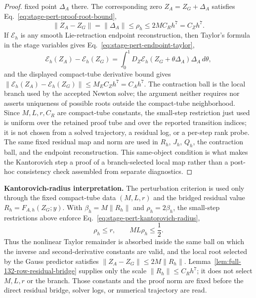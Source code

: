 \documentclass[preprint,12pt]{elsarticle}
\begin{document}
\begin{proof}
fixed point $\Delta_A$ there.  The corresponding zero
$Z_A=Z_G+\Delta_A$ satisfies Eq.~\eqref{eq:stage-pert-proof-root-bound},
\begin{equation}
\label{eq:stage-pert-proof-root-bound}
  \|Z_A-Z_G\|=\|\Delta_A\|\le\rho_h
  \le 2MC_Rh^7=C_Zh^7.
\end{equation}
If $\mathcal E_h$ is any smooth Lie-retraction endpoint reconstruction, then
Taylor's formula in the stage variables gives
Eq.~\eqref{eq:stage-pert-endpoint-taylor},
\begin{equation}
\label{eq:stage-pert-endpoint-taylor}
  \mathcal E_h(Z_A)-\mathcal E_h(Z_G)
  =
  \int_0^1D_Z\mathcal E_h(Z_G+\theta\Delta_A)\Delta_A\,d\theta ,
\end{equation}
and the displayed compact-tube derivative bound gives
\(\|\mathcal E_h(Z_A)-\mathcal E_h(Z_G)\|\le M_EC_Zh^7=C_Ah^7\).
The contraction ball is the local branch used by the accepted Newton solve;
the argument neither requires nor asserts uniqueness of possible roots outside
the compact-tube neighborhood. Since \(M,L,r,C_R\) are compact-tube constants,
the small-step restriction just used is uniform over the retained proof tube
and over the reported transition indices; it is not chosen from a solved
trajectory, a residual log, or a per-step rank probe.  The same fixed residual
map and norm are used in \(R_h\), \(J_h\), \(Q_h\), the contraction ball, and
the endpoint reconstruction.  This same-object condition is what makes the
Kantorovich step a proof of a branch-selected local map rather than a
post-hoc consistency check assembled from separate diagnostics.
\end{proof}

\noindent\textbf{Kantorovich-radius interpretation.}
The perturbation criterion is used only through the fixed compact-tube data
\((M,L,r)\) and the bridged residual value
\(R_h=F_{A,h}(Z_G;y)\).  With
\(\beta_h=M\|R_h\|\) and \(\rho_h=2\beta_h\), the small-step restrictions
above enforce Eq.~\eqref{eq:stage-pert-kantorovich-radius},
\begin{equation}
\label{eq:stage-pert-kantorovich-radius}
  \rho_h\le r,\qquad ML\rho_h\le \frac12 .
\end{equation}
Thus the nonlinear Taylor remainder is absorbed inside the same ball on which
the inverse and second-derivative constants are valid, and the local root
selected by the Gauss predictor satisfies
\(\|Z_A-Z_G\|\le 2M\|R_h\|\).  Lemma~\ref{lem:full-132-row-residual-bridge}
supplies only the scale \(\|R_h\|\le C_Rh^7\); it does not select \(M,L,r\)
or the branch.  Those constants and the proof norm are fixed before the
direct residual bridge, solver logs, or numerical trajectory are read.
\end{document}
